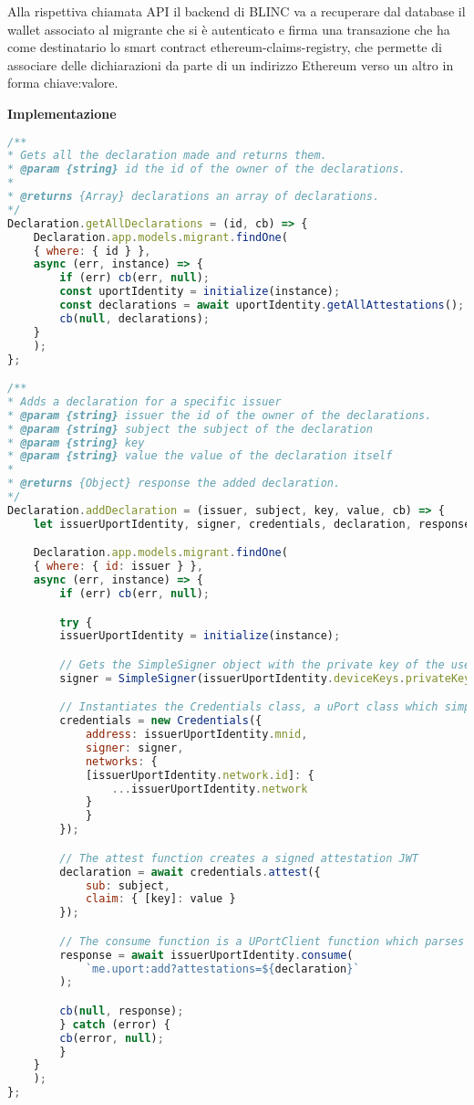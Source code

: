 Alla rispettiva chiamata API il backend di BLINC va a recuperare dal database
il wallet associato al migrante che si è autenticato e firma una transazione
che ha come destinatario lo smart contract ethereum-claims-registry, che permette
di associare delle dichiarazioni da parte di un indirizzo Ethereum 
verso un altro in forma chiave:valore.

\textbf{Implementazione}

\begin{lstlisting}[language=JavaScript]
/**
* Gets all the declaration made and returns them.
* @param {string} id the id of the owner of the declarations.
*
* @returns {Array} declarations an array of declarations.
*/
Declaration.getAllDeclarations = (id, cb) => {
    Declaration.app.models.migrant.findOne(
    { where: { id } },
    async (err, instance) => {
        if (err) cb(err, null);
        const uportIdentity = initialize(instance);
        const declarations = await uportIdentity.getAllAttestations();
        cb(null, declarations);
    }
    );
};

/**
* Adds a declaration for a specific issuer
* @param {string} issuer the id of the owner of the declarations.
* @param {string} subject the subject of the declaration
* @param {string} key
* @param {string} value the value of the declaration itself
*
* @returns {Object} response the added declaration.
*/
Declaration.addDeclaration = (issuer, subject, key, value, cb) => {
    let issuerUportIdentity, signer, credentials, declaration, response;

    Declaration.app.models.migrant.findOne(
    { where: { id: issuer } },
    async (err, instance) => {
        if (err) cb(err, null);

        try {
        issuerUportIdentity = initialize(instance);

        // Gets the SimpleSigner object with the private key of the user, which is needed to sign transactions
        signer = SimpleSigner(issuerUportIdentity.deviceKeys.privateKey);

        // Instantiates the Credentials class, a uPort class which simplifies the creation of signed attestation JWTs
        credentials = new Credentials({
            address: issuerUportIdentity.mnid,
            signer: signer,
            networks: {
            [issuerUportIdentity.network.id]: {
                ...issuerUportIdentity.network
            }
            }
        });

        // The attest function creates a signed attestation JWT
        declaration = await credentials.attest({
            sub: subject,
            claim: { [key]: value }
        });

        // The consume function is a UPortClient function which parses uPort uris and relays them to the responsible functions
        response = await issuerUportIdentity.consume(
            `me.uport:add?attestations=${declaration}`
        );

        cb(null, response);
        } catch (error) {
        cb(error, null);
        }
    }
    );
};
\end{lstlisting}

